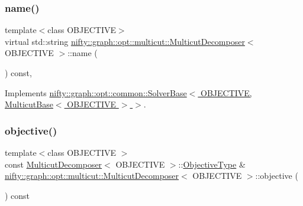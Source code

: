 \subsubsection{\texorpdfstring{name()}{name()}}
{\footnotesize\ttfamily template$<$class O\+B\+J\+E\+C\+T\+I\+VE$>$ \\
virtual std\+::string \hyperlink{classnifty_1_1graph_1_1opt_1_1multicut_1_1MulticutDecomposer}{nifty\+::graph\+::opt\+::multicut\+::\+Multicut\+Decomposer}$<$ O\+B\+J\+E\+C\+T\+I\+VE $>$\+::name (\begin{DoxyParamCaption}{ }\end{DoxyParamCaption}) const\hspace{0.3cm}{\ttfamily [inline]}, {\ttfamily [virtual]}}



Implements \hyperlink{classnifty_1_1graph_1_1opt_1_1common_1_1SolverBase_af638b9a804cfec3e35fe87c77e942d30}{nifty\+::graph\+::opt\+::common\+::\+Solver\+Base$<$ O\+B\+J\+E\+C\+T\+I\+V\+E, Multicut\+Base$<$ O\+B\+J\+E\+C\+T\+I\+V\+E $>$ $>$}.

\mbox{\label{classnifty_1_1graph_1_1opt_1_1multicut_1_1MulticutDecomposer_aa42822243117e0823b699d27d7b87876}} 
\subsubsection{\texorpdfstring{objective()}{objective()}}
{\footnotesize\ttfamily template$<$class O\+B\+J\+E\+C\+T\+I\+VE $>$ \\
const \hyperlink{classnifty_1_1graph_1_1opt_1_1multicut_1_1MulticutDecomposer}{Multicut\+Decomposer}$<$ O\+B\+J\+E\+C\+T\+I\+VE $>$\+::\hyperlink{classnifty_1_1graph_1_1opt_1_1multicut_1_1MulticutDecomposer_ab70024cf8bdd7baea7842c33de022ffd}{Objective\+Type} \& \hyperlink{classnifty_1_1graph_1_1opt_1_1multicut_1_1MulticutDecomposer}{nifty\+::graph\+::opt\+::multicut\+::\+Multicut\+Decomposer}$<$ O\+B\+J\+E\+C\+T\+I\+VE $>$\+::objective (\begin{DoxyParamCaption}{ }\end{DoxyParamCaption}) const\hspace{0.3cm}{\ttfamily [virtual]}}



